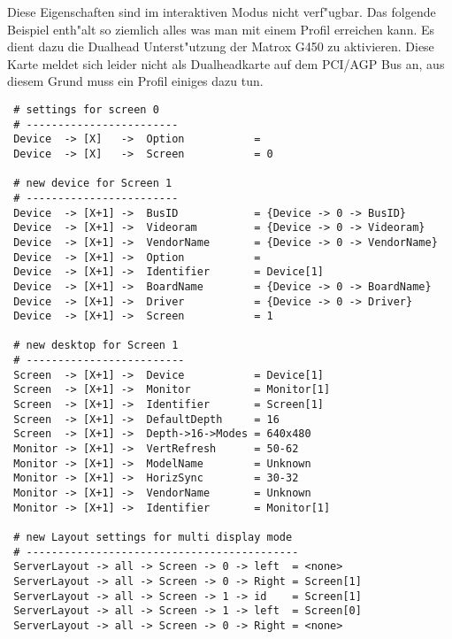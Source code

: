 Diese Eigenschaften sind im interaktiven Modus nicht verf"ugbar.
Das folgende Beispiel enth"alt so ziemlich alles was man mit
einem Profil erreichen kann. Es dient dazu die Dualhead
Unterst"utzung der Matrox G450 zu aktivieren. Diese Karte 
meldet sich leider nicht als Dualheadkarte auf dem PCI/AGP
Bus an, aus diesem Grund muss ein Profil einiges dazu tun.
\begin{verbatim}
 # settings for screen 0
 # ------------------------
 Device  -> [X]   ->  Option           =
 Device  -> [X]   ->  Screen           = 0

 # new device for Screen 1
 # ------------------------
 Device  -> [X+1] ->  BusID            = {Device -> 0 -> BusID}
 Device  -> [X+1] ->  Videoram         = {Device -> 0 -> Videoram}
 Device  -> [X+1] ->  VendorName       = {Device -> 0 -> VendorName}
 Device  -> [X+1] ->  Option           =
 Device  -> [X+1] ->  Identifier       = Device[1]
 Device  -> [X+1] ->  BoardName        = {Device -> 0 -> BoardName}
 Device  -> [X+1] ->  Driver           = {Device -> 0 -> Driver}
 Device  -> [X+1] ->  Screen           = 1

 # new desktop for Screen 1
 # -------------------------
 Screen  -> [X+1] ->  Device           = Device[1]
 Screen  -> [X+1] ->  Monitor          = Monitor[1]
 Screen  -> [X+1] ->  Identifier       = Screen[1]
 Screen  -> [X+1] ->  DefaultDepth     = 16
 Screen  -> [X+1] ->  Depth->16->Modes = 640x480
 Monitor -> [X+1] ->  VertRefresh      = 50-62
 Monitor -> [X+1] ->  ModelName        = Unknown
 Monitor -> [X+1] ->  HorizSync        = 30-32
 Monitor -> [X+1] ->  VendorName       = Unknown
 Monitor -> [X+1] ->  Identifier       = Monitor[1]

 # new Layout settings for multi display mode
 # -------------------------------------------
 ServerLayout -> all -> Screen -> 0 -> left  = <none>
 ServerLayout -> all -> Screen -> 0 -> Right = Screen[1]
 ServerLayout -> all -> Screen -> 1 -> id    = Screen[1]
 ServerLayout -> all -> Screen -> 1 -> left  = Screen[0]
 ServerLayout -> all -> Screen -> 0 -> Right = <none>
\end{verbatim}


